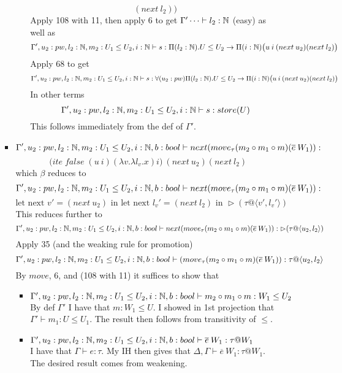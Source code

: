 \message{ !name(paper.tex)}\documentclass{article}
\begin{document}
\begin{itemize}
\begin{itemize}
\begin{itemize}
\begin{itemize}
\[(next \: l_2) \big)
\]
Apply 108 with 11, then apply 6 to get $\Gamma' \dots \vdash l_2: \mathbb{N}$ (easy) as well as 
\[\Gamma', u_2: pw, l_2: \mathbb{N}, m_2:U_1 \leq U_2, i : \mathbb{N} \vdash s : \Pi(l_2: \mathbb{N}).U \leq U_2 \rightarrow \Pi(i: \mathbb{N})\big(u \: i \: (next \: u_2)
(next \: l_2) \big)
\]
Apply 68 to get
\[\Gamma', u_2: pw, l_2: \mathbb{N}, m_2:U_1 \leq U_2, i : \mathbb{N} \vdash s : \forall(u_2: pw)\Pi(l_2: \mathbb{N}).U \leq U_2 \rightarrow \Pi(i: \mathbb{N})\big(u \: i \: (next \: u_2)
(next \: l_2) \big)
\]
In other terms 
\[\Gamma', u_2: pw, l_2: \mathbb{N}, m_2:U_1 \leq U_2, i : \mathbb{N} \vdash s : store(U)
\]
This follows immediately from the def of $\Gamma'$.
\end{itemize}
\item 
\[\Gamma', u_2: pw, l_2: \mathbb{N}, m_2:U_1 \leq U_2, i : \mathbb{N}, b: bool  \vdash  next
(move_{\tau}(m_2 \circ m_1 \circ m) 
(\overline{e}\: W_1)) :\]
\[ \Big( ite \; false \; (u\:i)(\lambda v. \lambda l_v. x) i \Big) \: (next \: u_2)
(next \: l_2)
\]
which $\beta$ reduces to 
\[\Gamma', u_2: pw, l_2: \mathbb{N}, m_2:U_1 \leq U_2, i : \mathbb{N}, b: bool  \vdash  next
(move_{\tau}(m_2 \circ m_1 \circ m) 
(\overline{e}\: W_1)) :\]
\[\text{let next }v' = (next \: u_2) \text{ in let next } l_v' = (next \: l_2) \text{ in } \rhd(\tau @ \langle v', l_v' \rangle)\]
This reduces further to
\[\Gamma', u_2: pw, l_2: \mathbb{N}, m_2:U_1 \leq U_2, i : \mathbb{N}, b: bool  \vdash  next
(move_{\tau}(m_2 \circ m_1 \circ m) 
(\overline{e}\: W_1)) : \rhd(\tau @ \langle u_2, l_2 \rangle)\]
Apply 35 (and the weaking rule for promotion)
\[\Gamma', u_2: pw, l_2: \mathbb{N}, m_2:U_1 \leq U_2, i : \mathbb{N}, b: bool  \vdash 
(move_{\tau}(m_2 \circ m_1 \circ m) 
(\overline{e}\: W_1)) : \tau @ \langle u_2, l_2 \rangle\]
By $move$, 6, and (108 with 11) it suffices to show that
\begin{itemize}
    \item $\Gamma', u_2: pw, l_2: \mathbb{N}, m_2:U_1 \leq U_2, i : \mathbb{N}, b: bool  \vdash m_2 \circ m_1 \circ m: W_1 \leq U_2$\\
    By def $\Gamma'$ I have that $m : W_1 \leq U$. I showed in 1st projection that $\Gamma' \vdash m_1 : U \leq U_1$. The result then follows from transitivity of $\leq$.
    \item $\Gamma', u_2: pw, l_2: \mathbb{N}, m_2:U_1 \leq U_2, i : \mathbb{N}, b: bool  \vdash \overline{e}\: W_1 : \tau @ W_1$\\
    I have that $\Gamma \vdash e: \tau$. My IH then gives that $\Delta, \Gamma \vdash \overline{e}\: W_1 : \tau @ W_1$. The desired result comes from weakening.
\end{itemize}
\end{itemize}

\end{itemize}
\end{itemize}
\end{document}
